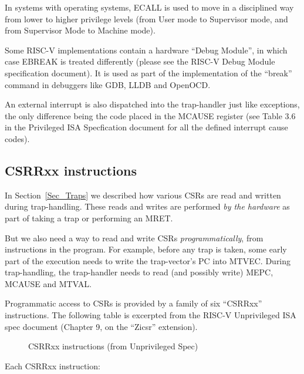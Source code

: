 In systems with operating systems, ECALL is used to move in a
disciplined way from lower to higher privilege levels (from User mode
to Supervisor mode, and from Supervisor Mode to Machine mode).

Some RISC-V implementations contain a hardware ``Debug Module'', in
which case EBREAK is treated differently (please see the RISC-V Debug
Module specification document).  It is used as part of the
implementation of the ``break'' command in debuggers like GDB, LLDB
and OpenOCD.

An external interrupt is also dispatched into the trap-handler just
like exceptions, the only difference being the code placed in the
MCAUSE register (see Table 3.6 in the Privileged ISA Specfication
document for all the defined interrupt cause codes).


\subsection{CSRRxx instructions}

\label{sec_CSRRxx}

In Section~\ref{Sec_Traps} we described how various CSRs are read and
written during trap-handling.  These reads and writes are performed
\emph{by the hardware} as part of taking a trap or performing an MRET.

But we also need a way to read and write CSRs \emph{programmatically},
{\ie} from instructions in the program.  For example, before any trap
is taken, some early part of the execution needs to write the
trap-vector's PC into MTVEC.  During trap-handling, the trap-handler
needs to read (and possibly write) MEPC, MCAUSE and MTVAL.

Programmatic access to CSRs is provided by a family of six ``CSRRxx''
instructions.  The following table is excerpted from the RISC-V
Unprivileged ISA spec document (Chapter 9, on the ``Zicsr''
extension).
\begin{figure}[htbp]
  \centerline{}
  \caption{\label{Fig_CSRRxx_spec} CSRRxx instructions (from Unprivileged Spec)}
\end{figure}
Each CSRRxx instruction:

